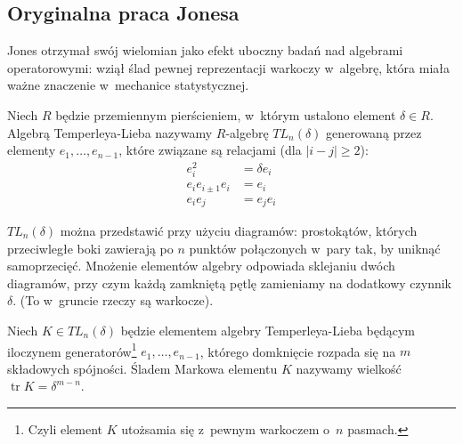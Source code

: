 \subsection{Oryginalna praca Jonesa} %
\label{sub:jones_paper}
Jones otrzymał swój wielomian jako efekt uboczny badań nad algebrami operatorowymi: wziął ślad pewnej reprezentacji warkoczy w~algebrę, która miała ważne znaczenie w~mechanice statystycznej.


\begin{definition}
    Niech $R$ będzie przemiennym pierścieniem, w~którym ustalono element $\delta \in R$.
    Algebrą Temperleya-Lieba nazywamy $R$-algebrę $TL_n(\delta)$ generowaną przez elementy $e_1, \ldots, e_{n-1}$, które związane są relacjami (dla $|i-j| \ge 2$):
    \begin{align*}
        e_i^2 & = \delta e_i \\
        e_i e_{i \pm 1} e_i & = e_i \\
        e_i e_j & = e_j e_i
    \end{align*}
\end{definition}

$TL_n(\delta)$ można przedstawić przy użyciu diagramów: prostokątów, których przeciwległe boki zawierają po $n$ punktów połączonych w~pary tak, by uniknąć samoprzecięć. Mnożenie elementów algebry odpowiada sklejaniu dwóch diagramów, przy czym każdą zamkniętą pętlę zamieniamy na dodatkowy czynnik $\delta$.
(To w~gruncie rzeczy są warkocze).

\begin{definition}
    Niech $K \in TL_n(\delta)$ będzie elementem algebry Temperleya-Lieba będącym iloczynem generatorów\footnote{Czyli element $K$ utożsamia się z~pewnym warkoczem o~$n$ pasmach.} $e_1, \ldots, e_{n-1}$, którego domknięcie rozpada się na $m$ składowych spójności.
    Śladem Markowa elementu $K$ nazywamy wielkość $\operatorname{tr} K = \delta^{m-n}$.
\end{definition}

